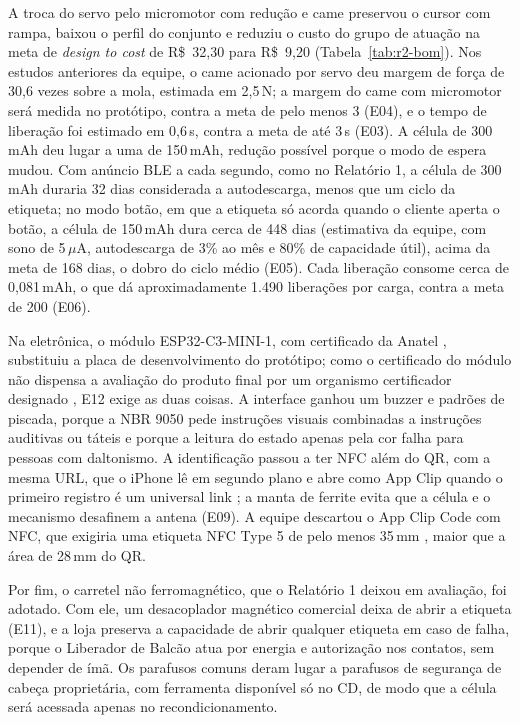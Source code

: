A troca do servo pelo micromotor com redução e came preservou o cursor com rampa, baixou o perfil do conjunto e reduziu o custo do grupo de atuação na meta de \textit{design to cost} de R\$~32,30 para R\$~9,20 (Tabela~\ref{tab:r2-bom}). Nos estudos anteriores da equipe, o came acionado por servo deu margem de força de 30,6 vezes sobre a mola, estimada em 2,5\,N; a margem do came com micromotor será medida no protótipo, contra a meta de pelo menos 3 (E04), e o tempo de liberação foi estimado em 0,6\,s, contra a meta de até 3\,s (E03). A célula de 300\,mAh deu lugar a uma de 150\,mAh, redução possível porque o modo de espera mudou. Com anúncio BLE a cada segundo, como no Relatório 1, a célula de 300\,mAh duraria 32 dias considerada a autodescarga, menos que um ciclo da etiqueta; no modo botão, em que a etiqueta só acorda quando o cliente aperta o botão, a célula de 150\,mAh dura cerca de 448 dias (estimativa da equipe, com sono de 5\,$\mu$A, autodescarga de 3\% ao mês e 80\% de capacidade útil), acima da meta de 168 dias, o dobro do ciclo médio (E05). Cada liberação consome cerca de 0,081\,mAh, o que dá aproximadamente 1.490 liberações por carga, contra a meta de 200 (E06).

Na eletrônica, o módulo ESP32-C3-MINI-1, com certificado da Anatel \cite{espressif2026certificados}, substituiu a placa de desenvolvimento do protótipo; como o certificado do módulo não dispensa a avaliação do produto final por um organismo certificador designado \cite{anatel2019res715}, E12 exige as duas coisas. A interface ganhou um buzzer e padrões de piscada, porque a NBR 9050 pede instruções visuais combinadas a instruções auditivas ou táteis \cite{abnt2020nbr9050} e porque a leitura do estado apenas pela cor falha para pessoas com daltonismo. A identificação passou a ter NFC além do QR, com a mesma URL, que o iPhone lê em segundo plano e abre como App Clip quando o primeiro registro é um universal link \cite{apple2026corenfc}; a manta de ferrite evita que a célula e o mecanismo desafinem a antena (E09). A equipe descartou o App Clip Code com NFC, que exigiria uma etiqueta NFC Type 5 de pelo menos 35\,mm \cite{apple2026appcliphig}, maior que a área de 28\,mm do QR.

Por fim, o carretel não ferromagnético, que o Relatório 1 deixou em avaliação, foi adotado. Com ele, um desacoplador magnético comercial deixa de abrir a etiqueta (E11), e a loja preserva a capacidade de abrir qualquer etiqueta em caso de falha, porque o Liberador de Balcão atua por energia e autorização nos contatos, sem depender de ímã. Os parafusos comuns deram lugar a parafusos de segurança de cabeça proprietária, com ferramenta disponível só no CD, de modo que a célula será acessada apenas no recondicionamento.

